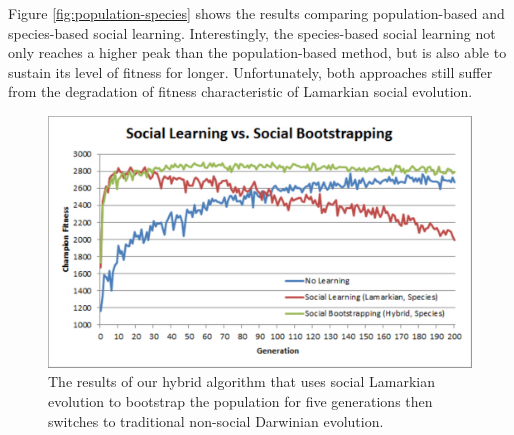 \documentclass{acm_proc_article-sp}
\begin{document}
Figure \ref{fig:population-species} shows the results comparing population-based and species-based social learning. Interestingly, the species-based social learning not only reaches a higher peak than the population-based method, but is also able to sustain its level of fitness for longer. Unfortunately, both approaches still suffer from the degradation of fitness characteristic of Lamarkian social evolution.

\begin{figure}
  \centering
    \includegraphics[scale=.35]{learning_bootstrapping.pdf}
  \caption{The results of our hybrid algorithm that uses social Lamarkian evolution to bootstrap the population for five generations then switches to traditional non-social Darwinian evolution.}
  \label{fig:learning-bootstrapping}
\end{figure}


\end{document}
